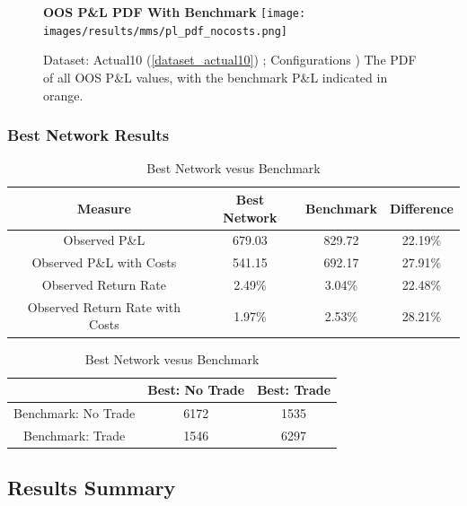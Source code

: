 \documentclass[a4paper,11pt,oneside]{article}
\theoremstyle{plain}
\theoremstyle{definition}
\begin{document}
\begin{figure}[H]
	\centering
	\textbf{OOS P\&L PDF With Benchmark}
	\texttt{[image: images/results/mms/pl\_pdf\_nocosts.png]} 
	\caption{Dataset: Actual10 (\ref{dataset_actual10}) ; Configurations )
		\newline The PDF of all OOS P\&L values, with the benchmark P\&L indicated in orange.}
	\label{figure-results_pl_pdf}
\end{figure}

\subsubsection{Best Network Results}

\begin{table}[h]
	\centering
	\begin{tabular}{|c|c|c|c|}
		\hline
		\textbf{Measure} &\textbf{Best Network} & \textbf{Benchmark} & \textbf{Difference}\\\hline	
		{Observed P\&L} & {679.03} & {829.72} & {22.19\%} \\\hline
		{Observed P\&L with Costs} & {541.15} & {692.17} & {27.91\%} \\\hline
		{Observed Return Rate} & {2.49\%} & {3.04\%} & {22.48\%} \\\hline
		{Observed Return Rate with Costs} & {1.97\%} & {2.53\%} & {28.21\%} \\\hline
	\end{tabular}
	\newline\newline
	\caption{Best Network vesus Benchmark}\label{tab_bestvsbenchmark}
\end{table}

\begin{table}[h]
	\centering
	\begin{tabular}{|c|c|c|}
		\hline
		\textbf{} &\textbf{Best: No Trade} & \textbf{Best: Trade} \\\hline	
		{Benchmark: No Trade} & {6172} & {1535} \\\hline
		{Benchmark: Trade} & {1546} & {6297} \\\hline
	\end{tabular}
	\newline\newline
	\caption{Best Network vesus Benchmark}\label{tab_best_confusion}
\end{table}

\newpage
\subsection{Results Summary}
\end{document}
